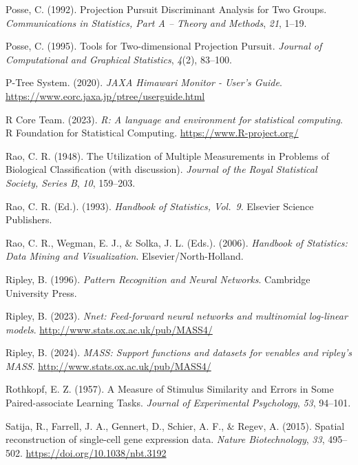 \documentclass[
  letterpaper,
]{krantz}
\newlength{\cslhangindent}
\newenvironment{CSLReferences}[2] %
 {\begin{list}{}{%
  \setlength{\itemindent}{0pt}
  \setlength{\leftmargin}{0pt}
  \setlength{\parsep}{0pt}
  \ifodd #1
   \setlength{\leftmargin}{\cslhangindent}
   \setlength{\itemindent}{-1\cslhangindent}
  \fi
  \setlength{\itemsep}{#2\baselineskip}}}
 {\end{list}}
\begin{document}
\begin{CSLReferences}{1}{0}
Posse, C. (1992). Projection {P}ursuit {D}iscriminant {A}nalysis for
{T}wo {G}roups. \emph{Communications in Statistics, Part A -- Theory and
Methods}, \emph{21}, 1--19.

Posse, C. (1995). Tools for {T}wo-dimensional {P}rojection {P}ursuit.
\emph{Journal of Computational and Graphical Statistics}, \emph{4}(2),
83--100.

P-Tree System. (2020). \emph{{JAXA Himawari Monitor - User's Guide}}.
\url{https://www.eorc.jaxa.jp/ptree/userguide.html}

R Core Team. (2023). \emph{R: A language and environment for statistical
computing}. R Foundation for Statistical Computing.
\url{https://www.R-project.org/}

Rao, C. R. (1948). The {U}tilization of {M}ultiple {M}easurements in
{P}roblems of {B}iological {C}lassification (with discussion).
\emph{Journal of the Royal Statistical Society, Series B}, \emph{10},
159--203.

Rao, C. R. (Ed.). (1993). \emph{{H}andbook of {S}tatistics, {V}ol.~9}.
Elsevier Science Publishers.

Rao, C. R., Wegman, E. J., \& Solka, J. L. (Eds.). (2006).
\emph{Handbook of {S}tatistics: {D}ata {M}ining and {V}isualization}.
Elsevier/North-Holland.

Ripley, B. (1996). \emph{Pattern {R}ecognition and {N}eural {N}etworks}.
Cambridge University Press.

Ripley, B. (2023). \emph{Nnet: Feed-forward neural networks and
multinomial log-linear models}.
\url{http://www.stats.ox.ac.uk/pub/MASS4/}

Ripley, B. (2024). \emph{MASS: Support functions and datasets for
venables and ripley's MASS}. \url{http://www.stats.ox.ac.uk/pub/MASS4/}

Rothkopf, E. Z. (1957). A {M}easure of {S}timulus {S}imilarity and
{E}rrors in {S}ome {P}aired-associate {L}earning {T}asks. \emph{Journal
of Experimental Psychology}, \emph{53}, 94--101.

Satija, R., Farrell, J. A., Gennert, D., Schier, A. F., \& Regev, A.
(2015). Spatial reconstruction of single-cell gene expression data.
\emph{Nature Biotechnology}, \emph{33}, 495--502.
\url{https://doi.org/10.1038/nbt.3192}


\end{CSLReferences}
\end{document}
